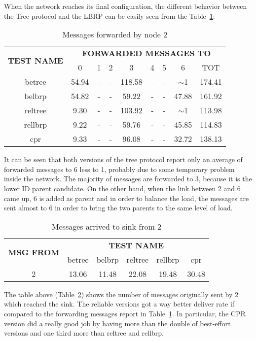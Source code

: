 \documentclass{article}
\begin{document}
When the network reaches its final configuration, the different behavior between the Tree protocol and the LBRP can be easily seen from the Table~\ref{tab:newF2}:
		\begin{table}[H]
			\begin{center}
			    \begin{tabular}{|c|c|c|c|c|c|c|c|c|}
				    \hline
				    \multirow{2}{*}{\textbf{TEST NAME}} & \multicolumn{8}{c|}{\textbf{FORWARDED MESSAGES TO}} \\ \cline{2-9}
					& 0 & 1 & 2 & 3 & 4 & 5 & 6 & TOT \\ \hline
				    betree & 54.94 & - & - & 118.58 & - & - & $\sim$1 & 174.41 \\ \hline
				    belbrp & 54.82 & - & - & 59.22 & - & - & 47.88 & 161.92 \\ \hline
				    reltree & 9.30 & - & - & 103.92 & - & - & $\sim$1 & 113.98 \\ \hline
   				    rellbrp & 9.22 & - & - & 59.76 & - & - & 45.85 & 114.83 \\ \hline
				    cpr & 9.33 & - & - & 96.08 & - & - & 32.72 & 138.13 \\ \hline
			    \end{tabular}
			\end{center}	
			\caption{Messages forwarded by node 2}
			\label{tab:newF2}
		\end{table}
It can be seen that both versions of the tree protocol report only an average of forwarded messages to 6 less to 1, probably due to some temporary problem inside the network. The majority of messages are forwarded to 3, because it is the lower ID parent candidate. On the other hand, when the link between 2 and 6 came up, 6 is added as parent and in order to balance the load, the messages are sent almost to 6 in order to bring the two parents to the same level of load.
		\begin{table}[H]
			\begin{center}
			    \begin{tabular}{|c|c|c|c|c|c|}
				    \hline
				    \multirow{2}{*}{\textbf{MSG FROM}} & \multicolumn{5}{c|}{\textbf{TEST NAME}} \\ \cline{2-6}
					& betree & belbrp & reltree & rellbrp & cpr \\ \hline
					2 & 13.06 & 11.48 & 22.08 & 19.48 & 30.48 \\ \hline
			    \end{tabular}
			\end{center}	
			\caption{Messages arrived to sink from 2}
			\label{tab:newA2}
		\end{table}
The table above (Table~\ref{tab:newA2}) shows the number of messages originally sent by 2 which reached the sink. The reliable versions got a way better deliver rate if compared to the forwarding messages report in Table~\ref{tab:newF2}. In particular, the CPR version did a really good job by having more than the double of best-effort versions and one third more than reltree and rellbrp.
\end{document}
